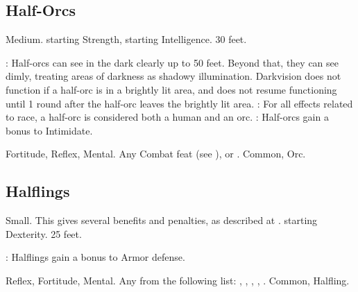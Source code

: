 \subsection{Half-Orcs}
 Medium.
  starting Strength,  starting Intelligence.
 30 feet.
\begin{itemize}
    : Half-orcs can see in the dark clearly up to 50 feet.   Beyond that, they can see dimly, treating areas of darkness as shadowy illumination. Darkvision does not function if a half-orc is in a brightly lit area, and does not resume functioning until 1 round after the half-orc leaves the brightly lit area.
    : For all effects related to race, a half-orc is considered both a human and an orc.
    : Half-orcs gain a  bonus to Intimidate.
\end{itemize}
  Fortitude,  Reflex,  Mental.
 Any Combat feat (see ), or .
 Common, Orc.

\subsection{Halflings}
 Small. This gives several benefits and penalties, as described at .
  starting Dexterity.
 25 feet.
\begin{itemize}
    : Halflings gain a  bonus to Armor defense.
\end{itemize}
  Reflex,  Fortitude,  Mental.
 Any from the following list: , , , , .
 Common, Halfling.
